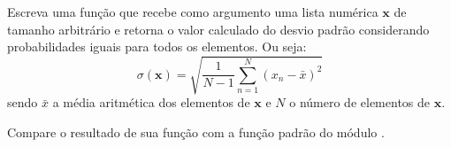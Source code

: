 Escreva uma função que recebe como argumento uma lista numérica $\mathbf{x}$ de tamanho arbitrário e retorna o
valor calculado do desvio padrão considerando probabilidades iguais para todos os elementos.
Ou seja:
\begin{equation}
    \sigma(\mathbf{x}) = \sqrt{\dfrac{1}{N-1} \sum _{n=1} ^N \left( x_n - \bar{x} \right)^2}
\end{equation}
sendo $\bar{x}$ a média aritmética dos elementos de $\mathbf{x}$ e $N$ o número de elementos de $\mathbf{x}$.

Compare o resultado de sua função com a função padrão  do módulo .



